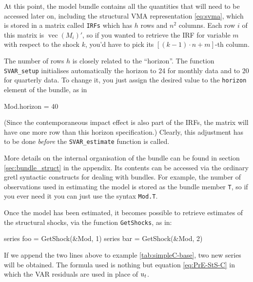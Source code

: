 \documentclass[a4paper,10pt]{article}
\newcommand{\app}[1]{\textsf{#1}}
\newcommand{\PrE}[1]{\ensuremath u_{#1}} %
\DeclareMathOperator{\VEC}{\mathrm{vec}}
\begin{document}
At this point, the model bundle contains all the quantities that will
need to be accessed later on, including the structural VMA
representation \eqref{eq:svma}, which is stored in a matrix called
\texttt{IRFs} which has $h$ rows and $n^2$ columns. Each row $i$ of
this matrix is $\VEC(M_i)'$, so if you wanted to retrieve the IRF for
variable $m$ with respect to the shock $k$, you'd have to pick its
$[(k-1)\cdot n + m]$-th column.

The number of rows $h$ is closely related to the ``horizon''. The function
\texttt{SVAR\_setup} initialises automatically the horizon to 24 for
monthly data and to 20 for quarterly data. To change it, you just
assign the desired value to the \texttt{horizon} element of the
bundle, as in
\begin{code}
  Mod.horizon = 40
\end{code}
(Since the contemporaneous impact effect is also part of the IRFs, the 
matrix will have one more row than this horizon specification.)
Clearly, this adjustment has to be done \emph{before} the
\texttt{SVAR\_estimate} function is called.
 
More details on the internal organisation of the bundle can be
found in section \ref{sec:bundle_struct} in the appendix. Its contents
can be accessed via the ordinary \app{gretl} syntactic constructs for
dealing with bundles. For example, the number of observations used in
estimating the model is stored as the bundle member \texttt{T}, so
if you ever need it you can just use the syntax \texttt{Mod.T}.

Once the model has been estimated, it becomes possible to retrieve
estimates of the structural shocks, via the function
\texttt{GetShocks}, as in:
\begin{code}
  series foo = GetShock(&Mod, 1)
  series bar = GetShock(&Mod, 2)
\end{code}
If we append the two lines above to example \ref{tab:simpleC-base},
two new series will be obtained. The formula used is nothing but
equation \eqref{eq:PrE-StS-C} in which the VAR residuals are used in
place of $\PrE{t}$.

\bigskip
\end{document}
